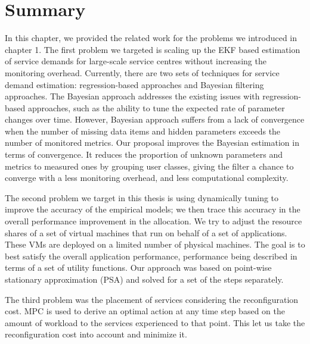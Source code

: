   \section{Summary}   
 In this chapter, we provided the related work for the problems we introduced in chapter 1. The first problem we targeted is scaling up the EKF based estimation of service demands for large-scale service centres without increasing the monitoring overhead. Currently, there are two sets of techniques for service demand estimation:  regression-based approaches and Bayesian filtering approaches. The Bayesian approach addresses the existing issues with regression-based approaches, such as  the ability to tune the expected rate of parameter changes over time.
 However, Bayesian approach suffers from a lack of convergence when the number of missing data items and hidden parameters exceeds the number of monitored metrics. Our proposal improves the Bayesian estimation in terms of convergence. It reduces the proportion of unknown parameters and metrics to measured ones by grouping user classes, giving the filter a chance to converge with a less monitoring overhead, and less computational complexity. 
 
 The second problem we target in this thesis is using dynamically tuning to improve the accuracy of the empirical models; we then trace this accuracy in the overall performance improvement in the allocation. We try to adjust the resource shares of a set of virtual machines that run on behalf of a set of applications. These VMs are deployed on a limited number of physical machines. The goal is to best satisfy the overall application performance, performance being
 described in terms of a set of utility functions. Our approach was based on point-wise stationary approximation (PSA) and solved for a set of the steps separately.
	   
	The third problem was the placement of services considering the reconfiguration cost. MPC is used to derive an optimal action at any time step based on the amount of workload to the services experienced to that point. This let us take the reconfiguration cost into account and minimize it.


